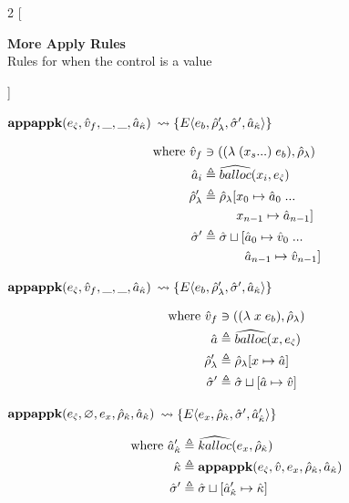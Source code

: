\documentclass[12pt,draft]{article}
\newcommand{\lamsyn}[2]{(\lambda\;(#1 ...)\;#2)}
\newcommand{\vararglamsyn}[2]{(\lambda\;#1\;#2)}
\newcommand{\E}[4]{E\langle #1 , #2 , #3 , #4 \rangle}
\begin{document}
\begin{multicols*}{2}
[
\begin{center}
\textbf{More Apply Rules} \\
Rules for when the control is a value
\end{center}
]
\begin{center}
  $\textbf{appappk}(e_{\hat{\varsigma}}, \hat{v}_f , \_, \_ , \hat{a}_{\hat{\kappa}})$
  $\leadsto \{\E{e_b}{\aenv_{\lambda}'}{\astore'}{\akaddr}\}$
\end{center}
\vspace{-7mm}
\begin{align*}
  \text{where }
  \aval_f &\ni (\lamsyn{x_s}{e_b} , \aenv_{\lambda}) \\
  \abaddr_i &\triangleq \aballoc{x_i , \ectrl} \\
  \aenv_{\lambda}' &\triangleq \aenv_{\lambda}[x_0 \mapsto \abaddr_0\;... \\
                        &\;\;\;\;\;\;\;\;\;\,x_{n-1} \mapsto \abaddr_{n-1}] \\
  \astore' &\triangleq \astore \sqcup [\abaddr_0 \mapsto \aval_0\;... \\
                        &\;\;\;\;\;\;\;\;\;\;\;\;\abaddr_{n-1} \mapsto \aval_{n-1}]
\end{align*}
\begin{center}
  $\textbf{appappk}(e_{\hat{\varsigma}}, \hat{v}_f, \_, \_, \hat{a}_{\hat{\kappa}})$
  $\leadsto \{\E{e_b}{\aenv_{\lambda}'}{\astore'}{\akaddr}\}$
\end{center}
\vspace{-7mm}
\begin{align*}
  \text{where }
  \aval_f &\ni (\vararglamsyn{x}{e_b} , \aenv_{\lambda}) \\
  \abaddr &\triangleq \aballoc{x , \ectrl} \\
  \aenv_{\lambda}' &\triangleq \aenv_{\lambda}[x \mapsto \abaddr] \\
  \astore' &\triangleq \astore \sqcup [\abaddr \mapsto \aval]
\end{align*}
\begin{center}
  $\textbf{appappk}(e_{\hat{\varsigma}}, \varnothing , e_x , \hat{\rho}_{\hat{\kappa}} , \hat{a}_{\hat{\kappa}})$
  $\leadsto \{\E{e_x}{\aenv_{\akont}}{\astore'}{\akaddr'}\}$
\end{center}
\vspace{-7mm}
\begin{align*}
  \text{where }
  \hat{a}_{\hat{\kappa}}' &\triangleq \widehat{kalloc}(e_x , \hat{\rho}_{\hat{\kappa}}) \\
  \hat{\kappa} &\triangleq \textbf{appappk}(e_{\hat{\varsigma}},\hat{v},e_x,\hat{\rho}_{\hat{\kappa}},\hat{a}_{\hat{\kappa}}) \\
  \hat{\sigma}' &\triangleq \hat{\sigma} \sqcup [\hat{a}_{\hat{\kappa}}' \mapsto \hat{\kappa}]
\end{align*}


\end{multicols*}
\end{document}
